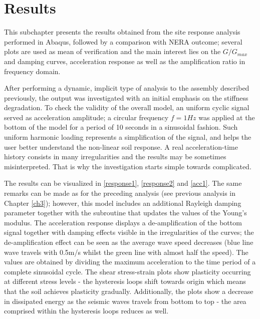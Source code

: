 	\section{Results}
	This subchapter presents the results obtained from the site response analysis performed in Abaqus, followed by a comparison with NERA outcome; several plots are used as mean of verification and the main interest lies on the $G/G_{max}$ and damping curves, acceleration response as well as the amplification ratio in frequency domain.
	
	After performing a dynamic, implicit type of analysis to the assembly described previously, the output was investigated with an initial emphasis on the stiffness degradation. To check the validity of the overall model, an uniform cyclic signal served as acceleration amplitude; a circular frequency $f=1 Hz$ was applied at the bottom of the model for a period of 10 seconds in a sinusoidal fashion. Such uniform harmonic loading represents a simplification of the signal, and helps the user better understand the non-linear soil response. A real acceleration-time history consists in many irregularities and the results may be sometimes misinterpreted. That is why the investigation starts simple towards complicated.
	
	The results can be visualized in \ref{response1}, \ref{response2} and \ref{acc1}. The same remarks can be made as for the preceding analysis (see previous analysis in Chapter \ref{ch3}); however, this model includes an additional Rayleigh damping parameter together with the subroutine that updates the values of the Young's modulus. The acceleration response displays a de-amplification of the bottom signal together with damping effects visible in the irregularities of the curves; the de-amplification effect can be seen as the average wave speed decreases (blue line wave travels with 0.5m/s whilst the green line with almost half the speed). The values are obtained by dividing the maximum acceleration to the time period of a complete sinusoidal cycle. The shear stress-strain plots show plasticity occurring at different stress levels - the hysteresis loops shift towards origin which means that the soil achieves plasticity gradually. Additionally, the plots show a decrease in dissipated energy as the seismic waves travels from bottom to top - the area comprised within the hysteresis loops reduces as well.
	
